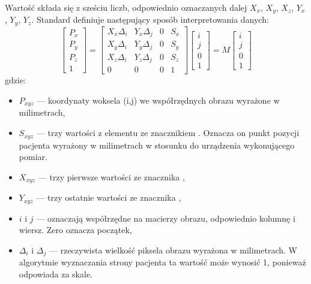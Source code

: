 \par
Wartość  składa się z sześciu liczb, odpowiednio oznaczanych dalej $X_x$, $X_y$, $X_z$, $Y_x$, $Y_y$, $Y_z$.
Standard \DICOM definiuje następujący sposób interpretowania danych:
\[
    \begin{bmatrix}
        P_x \\ P_y \\ P_z \\ 1
    \end{bmatrix}
    =
    \begin{bmatrix}
        X_x\Delta_i & Y_x\Delta_j & 0 & S_x \\
        X_y\Delta_i & Y_y\Delta_j & 0 & S_y \\
        X_z\Delta_i & Y_z\Delta_j & 0 & S_z \\
        0           & 0           & 0 & 1
    \end{bmatrix}
    \begin{bmatrix}
        i \\ j \\ 0 \\ 1
    \end{bmatrix}
    =
    M
    \begin{bmatrix}
        i \\ j \\ 0 \\ 1
    \end{bmatrix}
\]
gdzie:
\begin{itemize}
    \item $P_{xyz}$ --- koordynaty woksela (i,j) we współrzędnych obrazu wyrażone w milimetrach,
    \item $S_{xyz}$ --- trzy wartości z elementu ze znacznikiem . Oznacza on punkt pozycji pacjenta wyrażony w milimetrach w stosunku do urządzenia wykonującego pomiar.
    \item $X_{xyz}$ --- trzy pierwsze wartości ze znacznika ,
    \item $Y_{xyz}$ --- trzy ostatnie wartości ze znacznika ,
    \item $i$ i $j$ --- oznaczają współrzędne na macierzy obrazu, odpowiednio kolumnę i wiersz. Zero oznacza początek,
    \item $\Delta_i$ i $\Delta_j$ --- rzeczywista wielkość piksela obrazu wyrażona w milimetrach.
          W algorytmie wyznaczania strony pacjenta ta wartość może wynosić 1, ponieważ odpowiada za skale.
\end{itemize}

